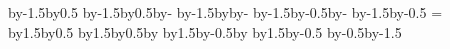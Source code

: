 {{    \pgf@anchor@pcbtact@pine\pgfpathcircle{\pgfpoint{\pgf@x}{\pgf@y}}{\pgfutil@tempdima}
    \pgf@anchor@pcbtact@pine\pgfpathcircle{\pgfpoint{\pgf@x}{\pgf@y}}{\pgfutil@tempdimb}
    \pgf@anchor@pcbtact@pinf\pgfpathcircle{\pgfpoint{\pgf@x}{\pgf@y}}{\pgfutil@tempdima}
    \pgf@anchor@pcbtact@pinf\pgfpathcircle{\pgfpoint{\pgf@x}{\pgf@y}}{\pgfutil@tempdimb}
    \color{gray}
    \pgfsetlinewidth{2\pgflinewidth}
    \centerpoint\advance\pgf@x by-1.5\pgfutil@tempdimc\advance\pgf@y by0.5\pgfutil@tempdimd\pgfpathmoveto{\pgfpoint{\pgf@x}{\pgf@y}}
    \centerpoint\advance\pgf@x by-1.5\pgfutil@tempdimc\advance\pgf@y by0.5\pgfutil@tempdimd\advance\pgf@x by-\pgfutil@tempdime\pgfpathlineto{\pgfpoint{\pgf@x}{\pgf@y}}
    \centerpoint\advance\pgf@x by-1.5\pgfutil@tempdimc\advance\pgf@y by\pgfutil@tempdimf\advance\pgf@x by-\pgfutil@tempdime\pgfpathlineto{\pgfpoint{\pgf@x}{\pgf@y}}
    \centerpoint\advance\pgf@x by-1.5\pgfutil@tempdimc\advance\pgf@y by-0.5\pgfutil@tempdimd\advance\pgf@x by-\pgfutil@tempdime\pgfpathlineto{\pgfpoint{\pgf@x}{\pgf@y}}
    \centerpoint\advance\pgf@x by-1.5\pgfutil@tempdimc\advance\pgf@y by-0.5\pgfutil@tempdimd\pgfpathlineto{\pgfpoint{\pgf@x}{\pgf@y}}
    \pgfutil@tempdime=\tactright
    \centerpoint\advance\pgf@x by1.5\pgfutil@tempdimc\advance\pgf@y by0.5\pgfutil@tempdimd\pgfpathmoveto{\pgfpoint{\pgf@x}{\pgf@y}}
    \centerpoint\advance\pgf@x by1.5\pgfutil@tempdimc\advance\pgf@y by0.5\pgfutil@tempdimd\advance\pgf@x by\pgfutil@tempdime\pgfpathlineto{\pgfpoint{\pgf@x}{\pgf@y}}
    \centerpoint\advance\pgf@x by1.5\pgfutil@tempdimc\advance\pgf@y by-0.5\pgfutil@tempdimd\advance\pgf@x by\pgfutil@tempdime\pgfpathlineto{\pgfpoint{\pgf@x}{\pgf@y}}
    \centerpoint\advance\pgf@x by1.5\pgfutil@tempdimc\advance\pgf@y by-0.5\pgfutil@tempdimd\pgfpathlineto{\pgfpoint{\pgf@x}{\pgf@y}}
    \color{black}
    \begingroup
    \tikzset{pcb/part labels} %
    \tikz@textfont
    \centerpoint\advance\pgf@y by-0.5\pgfutil@tempdimd\advance\pgf@y by-1.5\pgfutil@tempdimb
    \endgroup
  }
}
% 
